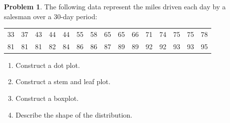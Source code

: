 \documentclass[11pt,a4paper]{article}
\theoremstyle{definition}
\newtheorem{problemx}{Problem}[section]
\newenvironment{problem}{\begin{problemx}}{\end{problemx}}
\begin{document}
\begin{problem}
The following data represent the miles driven each day by a salesman over a 30-day period:
\begin{table}[H]
\centering
\begin{tabular}{ccccccccccccccc}
33 & 37 & 43 & 44 & 44 & 55 & 58 & 65 & 65 & 66 & 71 & 74 & 75 & 75 & 78\\
81 & 81 & 81 & 82 & 84 & 86 & 86 & 87 & 89 & 89 & 92 & 92 & 93 & 93 & 95\\
\end{tabular}
\end{table}
\begin{enumerate}
\item[(a).] Construct a dot plot.
\item[(b).] Construct a stem and leaf plot.
\item[(c).] Construct a boxplot.
\item[(d).] Describe the shape of the distribution.
\end{enumerate}
\end{problem}
\end{document}
